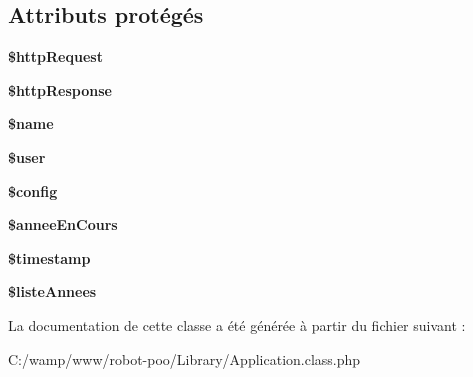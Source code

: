\subsection*{Attributs protégés}
\begin{DoxyCompactItemize}
\item 
\hypertarget{class_library_1_1_application_a880c2413655f6bf662d05261ec94815a}{{\bfseries \$http\+Request}}\label{class_library_1_1_application_a880c2413655f6bf662d05261ec94815a}

\item 
\hypertarget{class_library_1_1_application_a53a6f60bd0af5db4d881d05c1f312978}{{\bfseries \$http\+Response}}\label{class_library_1_1_application_a53a6f60bd0af5db4d881d05c1f312978}

\item 
\hypertarget{class_library_1_1_application_ab2fc40d43824ea3e1ce5d86dee0d763b}{{\bfseries \$name}}\label{class_library_1_1_application_ab2fc40d43824ea3e1ce5d86dee0d763b}

\item 
\hypertarget{class_library_1_1_application_a598ca4e71b15a1313ec95f0df1027ca5}{{\bfseries \$user}}\label{class_library_1_1_application_a598ca4e71b15a1313ec95f0df1027ca5}

\item 
\hypertarget{class_library_1_1_application_a49c7011be9c979d9174c52a8b83e5d8e}{{\bfseries \$config}}\label{class_library_1_1_application_a49c7011be9c979d9174c52a8b83e5d8e}

\item 
\hypertarget{class_library_1_1_application_a2695f1622a96c45c27bf3ec17dae0f6c}{{\bfseries \$annee\+En\+Cours}}\label{class_library_1_1_application_a2695f1622a96c45c27bf3ec17dae0f6c}

\item 
\hypertarget{class_library_1_1_application_a2b69de9676dd97c675cd4d9bcceb684c}{{\bfseries \$timestamp}}\label{class_library_1_1_application_a2b69de9676dd97c675cd4d9bcceb684c}

\item 
\hypertarget{class_library_1_1_application_a61f170dc08bf563ecd19e8e493af93b2}{{\bfseries \$liste\+Annees}}\label{class_library_1_1_application_a61f170dc08bf563ecd19e8e493af93b2}

\end{DoxyCompactItemize}


La documentation de cette classe a été générée à partir du fichier suivant \+:\begin{DoxyCompactItemize}
\item 
C\+:/wamp/www/robot-\/poo/\+Library/Application.\+class.\+php\end{DoxyCompactItemize}
